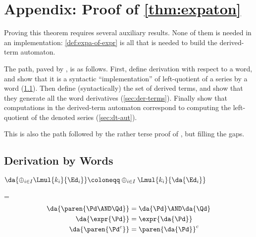 \documentclass[a4paper,USenglish]{lipics}
\begin{document}
\section{Appendix: Proof of \cref{thm:expaton}}
\label{app:proof:expaton}

Proving this theorem requires several auxiliary results.  None of them is
needed in an implementation: \cref{def:expa-of-expr} is all that is needed
to build the derived-term automaton.

The path, paved by \citet{lombardy.2005.tcs}, is as follows.  First, define
derivation with respect to a word, and show that it is a syntactic
``implementation'' of left-quotient of a series by a word
(\cref{sec:der:word}).  Then define (syntactically) the set of derived
terms, and show that they generate all the word derivatives
(\cref{sec:der-terms}).  Finally show that computations in the derived-term
automaton correspond to computing the left-quotient of the denoted series
(\cref{sec:dt-aut}).

This is also the path followed by the rather terse proof of
\citet[Proposition~4]{caron.2011.lata.2}, but filling the gaps.

\subsection{Derivation by Words}
\label{sec:der:word}
\begin{Definition}
  $\da{\oplus_{i \in I} \Lmul{k_i}{\Ed_i}}
  \coloneqq
  \oplus_{i \in I} \Lmul{k_i}{\da{\Ed_i}}$
\end{Definition}

\begin{Lemma}\label{lem:der:poly}
  \abovedisplayskip=\abovedisplayshortskip
  \begin{align}
    \label{eq:der:poly:and}
    \da{\paren{\Pd \AND \Qd}} &= \da{\Pd} \AND \da{\Qd} \\
    \label{eq:der:poly:expr}
    \da{\expr{\Pd}} &= \expr{\da{\Pd}}\\
    \label{eq:der:poly:compl}
    \da{\paren{\Pd^c}} &= \paren{\da{\Pd}}^c
  \end{align}
\end{Lemma}
\end{document}
